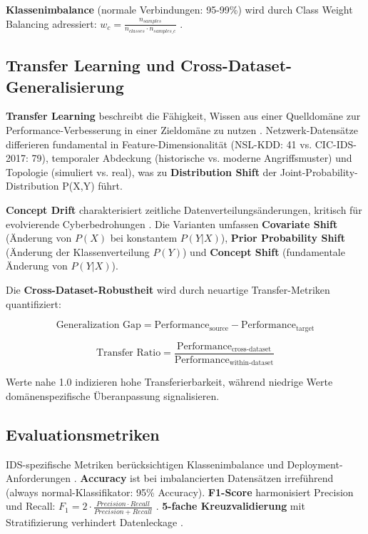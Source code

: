 \documentclass[11pt,a4paper]{article}
\begin{document}
    \textbf{Klassenimbalance} (normale Verbindungen: 95-99\%) wird durch Class Weight Balancing adressiert: $w_c = \frac{n_{samples}}{n_{classes} \cdot n_{samples\_c}}$ \parencite{Ring2019,Hastie2009}.

    \subsection{Transfer Learning und Cross-Dataset-Generalisierung}

    \textbf{Transfer Learning} beschreibt die Fähigkeit, Wissen aus einer Quelldomäne zur Performance-Verbesserung in einer Zieldomäne zu nutzen \parencite{Goodfellow2016}. Netzwerk-Datensätze differieren fundamental in Feature-Dimensionalität (NSL-KDD: 41 vs. CIC-IDS-2017: 79), temporaler Abdeckung (historische vs. moderne Angriffsmuster) und Topologie (simuliert vs. real), was zu \textbf{Distribution Shift} der Joint-Probability-Distribution P(X,Y) führt.

    \textbf{Concept Drift} charakterisiert zeitliche Datenverteilungsänderungen, kritisch für evolvierende Cyberbedrohungen \parencite{Ring2019}. Die Varianten umfassen \textbf{Covariate Shift} (Änderung von $P(X)$ bei konstantem $P(Y|X)$), \textbf{Prior Probability Shift} (Änderung der Klassenverteilung $P(Y)$) und \textbf{Concept Shift} (fundamentale Änderung von $P(Y|X)$).

    Die \textbf{Cross-Dataset-Robustheit} wird durch neuartige Transfer-Metriken quantifiziert:

    \begin{equation}
        \text{Generalization Gap} = \text{Performance}_{\text{source}} - \text{Performance}_{\text{target}}
    \end{equation}

    \begin{equation}
        \text{Transfer Ratio} = \frac{\text{Performance}_{\text{cross-dataset}}}{\text{Performance}_{\text{within-dataset}}}
    \end{equation}

    Werte nahe 1.0 indizieren hohe Transferierbarkeit, während niedrige Werte domänenspezifische Überanpassung signalisieren.

    \subsection{Evaluationsmetriken}

    IDS-spezifische Metriken berücksichtigen Klassenimbalance und Deployment-Anforderungen \parencite{Belavagi2016}. \textbf{Accuracy} ist bei imbalancierten Datensätzen irreführend (always normal-Klassifikator: 95\% Accuracy). \textbf{F1-Score} harmonisiert Precision und Recall: $F_1 = 2 \cdot \frac{Precision \cdot Recall}{Precision + Recall}$ \parencite{Hastie2009,Mourouzis2021}. \textbf{5-fache Kreuzvalidierung} mit Stratifizierung verhindert Datenleckage \parencite{Tavallaee2009}.
\end{document}
